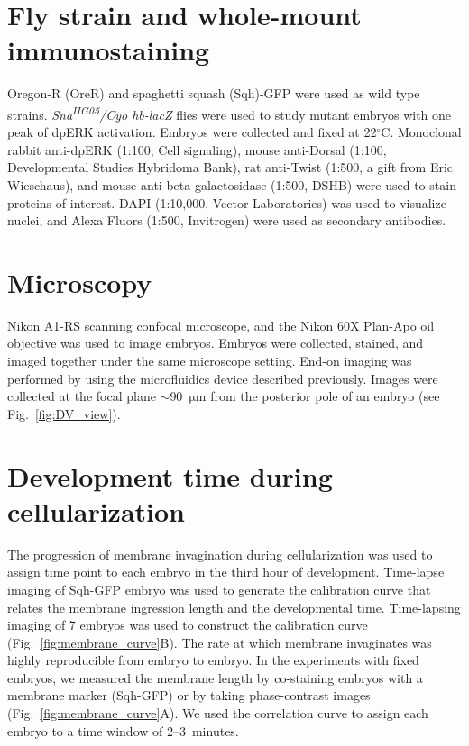 \documentclass{pnastwo}
\newcommand{\fig}[0]{Fig.}
\begin{document}
\begin{article}


\begin{materials}

\section{Fly strain and whole-mount immunostaining}
%
Oregon-R (OreR) and spaghetti squash (Sqh)-GFP were used as wild type strains. 
%
{\it Sna\textsuperscript{\it IIG05}/Cyo hb-lacZ} flies were used to study mutant embryos with one peak of dpERK activation.  
%
Embryos were collected and fixed at 22$^\circ$C. 
%
Monoclonal rabbit anti-dpERK (1:100, Cell signaling), mouse anti-Dorsal (1:100, Developmental Studies Hybridoma Bank), rat anti-Twist (1:500, a gift from Eric Wieschaus), and mouse anti-beta-galactosidase (1:500, DSHB) were used to stain proteins of interest. DAPI (1:10,000, Vector Laboratories) was used to visualize nuclei, and Alexa Fluors (1:500, Invitrogen) were used as secondary antibodies. 

\section{Microscopy}
%
Nikon A1-RS scanning confocal microscope, and the Nikon 60X Plan-Apo oil objective was used to image embryos. Embryos were collected, stained, and imaged together under the same microscope setting. End-on imaging was performed by using the microfluidics device described previously. Images were collected at the focal plane $\sim$90~$\mathrm{\mu m}$ from the posterior pole of an embryo (see \fig~\ref{fig:DV_view}). 

\section{Development time during cellularization} 
%
The progression of membrane invagination during cellularization was used to assign time point to each embryo in the third hour of development. Time-lapse imaging of Sqh-GFP embryo was used to generate the calibration curve that relates the membrane ingression length and the developmental time. Time-lapsing imaging of 7 embryos was used to construct the calibration curve (\fig~\ref{fig:membrane_curve}B). The rate at which membrane invaginates was highly reproducible from embryo to embryo. In the experiments with fixed embryos, we measured the membrane length by co-staining embryos with a membrane marker (Sqh-GFP) or by taking phase-contrast images (\fig~\ref{fig:membrane_curve}A). We used the correlation curve to assign each embryo to a time window of 2--3~minutes. 


\end{materials}
\end{article}
\end{document}
